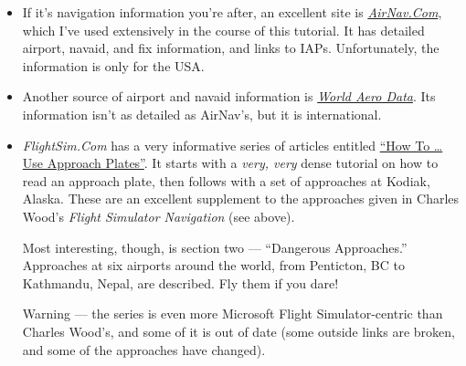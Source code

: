 \begin{itemize}
\item If it's navigation information you're after, an excellent site
  is \href{http://www.airnav.com}{\textit{AirNav.Com}}, which I've
  used extensively in the course of this tutorial.  It has detailed
  airport, navaid, and fix information, and links to IAPs.
  Unfortunately, the information is only for the USA.

\item Another source of airport and navaid information is
  \href{http://worldaerodata.com}{\textit{World Aero Data}}.  Its
  information isn't as detailed as AirNav's, but it is international.

\item \textit{FlightSim.Com} has a very informative series of articles
  entitled
  \href{http://www.flightsim.com/vbfs/content.php?2133}{``How
    To \ldots{} Use Approach Plates''}.  It starts with a \emph{very,
    very} dense tutorial on how to read an approach plate, then
  follows with a set of approaches at Kodiak, Alaska.  These are an
  excellent supplement to the approaches given in Charles Wood's
  \textit{Flight Simulator Navigation} (see above).

  Most interesting, though, is section two --- ``Dangerous
  Approaches.''  Approaches at six airports around the world, from
  Penticton, BC to Kathmandu, Nepal, are described.  Fly them if you
  dare!

  Warning --- the series is even more Microsoft Flight
  Simulator-centric than Charles Wood's, and some of it is out of date
  (some outside links are broken, and some of the approaches have
  changed).

%
%

%
%

%
%

%
%

%
%


\end{itemize}
